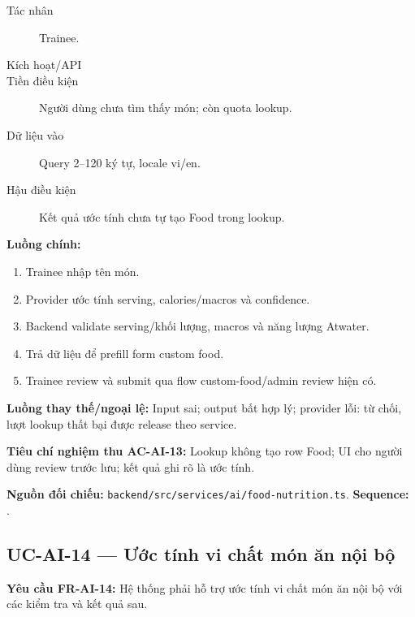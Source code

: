 \documentclass[12pt,a4paper]{article}
\newcommand{\evidence}[1]{{\small\nolinkurl{#1}}}
\begin{document}
\begin{description}
\item[Tác nhân] Trainee.
\item[Kích hoạt/API] 
\item[Tiền điều kiện] Người dùng chưa tìm thấy món; còn quota lookup.
\item[Dữ liệu vào] Query 2–120 ký tự, locale vi/en.
\item[Hậu điều kiện] Kết quả ước tính chưa tự tạo Food trong lookup.
\end{description}
\textbf{Luồng chính:}
\begin{enumerate}
  \item Trainee nhập tên món.
  \item Provider ước tính serving, calories/macros và confidence.
  \item Backend validate serving/khối lượng, macros và năng lượng Atwater.
  \item Trả dữ liệu để prefill form custom food.
  \item Trainee review và submit qua flow custom-food/admin review hiện có.
\end{enumerate}
\textbf{Luồng thay thế/ngoại lệ:} Input sai; output bất hợp lý; provider lỗi: từ chối, lượt lookup thất bại được release theo service.

\textbf{Tiêu chí nghiệm thu AC-AI-13:} Lookup không tạo row Food; UI cho người dùng review trước lưu; kết quả ghi rõ là ước tính.

\textbf{Nguồn đối chiếu:} \evidence{backend/src/services/ai/food-nutrition.ts}. \textbf{Sequence:} .

\subsection{UC-AI-14 --- Ước tính vi chất món ăn nội bộ}
\label{uc-ai-14}
\textbf{Yêu cầu FR-AI-14:} Hệ thống phải hỗ trợ ước tính vi chất món ăn nội bộ với các kiểm tra và kết quả sau.
\end{document}
